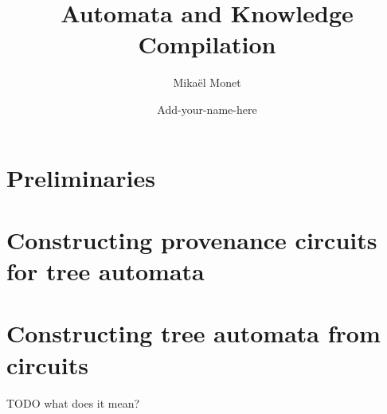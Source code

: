 \documentclass[a4paper]{scrartcl}
\begin{document}
\title{Automata and Knowledge Compilation}

\author{Mikaël Monet \and Add-your-name-here}

\date{}
\maketitle

\section{Preliminaries}


\section{Constructing provenance circuits for tree automata}


\section{Constructing tree automata from circuits}
TODO what does it mean?




\end{document}
